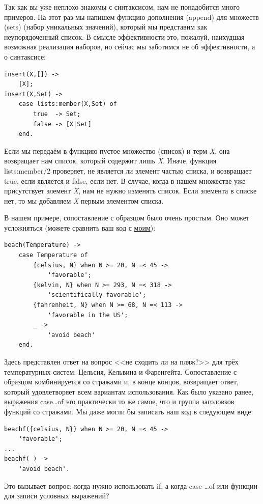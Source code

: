 \documentclass[a4paper,12pt]{report}
\newcommand{\ops}{\colorbox{lgreen}}
\begin{document}
Так как вы уже неплохо знакомы с синтаксисом, нам не понадобится много примеров. На этот раз мы напишем функцию дополнения (append) для множеств (sets) (набор уникальных значений), который мы представим как неупорядоченный список. В смысле эффективности это, пожалуй, наихудшая возможная реализация наборов, но сейчас мы заботимся не об эффективности, а о синтаксисе:
\begin{lstlisting}[style=erlang]
insert(X,[]) ->
    [X];
insert(X,Set) ->
    case lists:member(X,Set) of
        true  -> Set;
        false -> [X|Set]
    end.
\end{lstlisting}
Если мы передаём в функцию пустое множество (список) и терм \emph{X}, она возвращает нам список, который содержит лишь \emph{X}. Иначе, функция \ops{lists:member/2} проверяет, не является ли элемент частью списка, и возвращает true, если является и false, если нет. В случае, когда в нашем множестве уже присутствует элемент \emph{X}, нам не нужно изменять список. Если элемента в списке нет, то мы добавляем \emph{X} первым элементом списка.

В нашем примере, сопоставление с образцом было очень простым. Оно может усложняться (можете сравнить ваш код с \href{http://learnyousomeerlang.com/static/erlang/cases.erl}{моим}):
\begin{lstlisting}[style=erlang]
beach(Temperature) ->
    case Temperature of
        {celsius, N} when N >= 20, N =< 45 ->
            'favorable';
        {kelvin, N} when N >= 293, N =< 318 ->
            'scientifically favorable';
        {fahrenheit, N} when N >= 68, N =< 113 ->
            'favorable in the US';
        _ ->
            'avoid beach'
    end.
\end{lstlisting}
Здесь представлен ответ на вопрос <<не сходить ли  на пляж?>> для трёх температурных систем: Цельсия, Кельвина и Фаренгейта. Сопоставление с образцом комбинируется со стражами и, в конце концов, возвращает ответ, который удовлетворяет всем вариантам использования. Как было указано ранее,  выражения \ops{case\ldots of} это практически то же самое, что и группа заголовков функций со стражами. Мы даже могли бы записать наш код в следующем виде:
\begin{lstlisting}[style=erlang]
beachf({celsius, N}) when N >= 20, N =< 45 ->
    'favorable';
...
beachf(_) ->
    'avoid beach'.
\end{lstlisting}

Это вызывает вопрос: когда нужно использовать \ops{if}, а когда \ops{case \ldots of} или функции для записи условных выражений?
\end{document}

